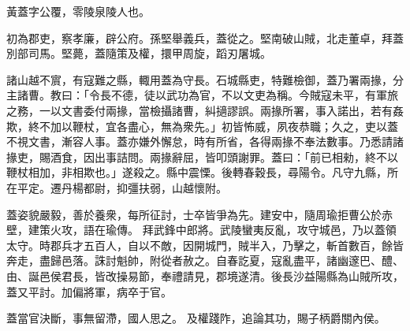 \begin{pinyinscope}
 
 
 黃蓋字公覆，零陵泉陵人也。
 
 
 初為郡吏，察孝廉，辟公府。孫堅舉義兵，蓋從之。堅南破山賊，北走董卓，拜蓋別部司馬。堅薨，蓋隨策及權，擐甲周旋，蹈刃屠城。
 
 
 
 
 諸山越不賔，有寇難之縣，輙用蓋為守長。石城縣吏，特難檢御，蓋乃署兩掾，分主諸曹。教曰：「令長不德，徒以武功為官，不以文吏為稱。今賊寇未平，有軍旅之務，一以文書委付兩掾，當檢攝諸曹，糾擿謬誤。兩掾所署，事入諾出，若有姦欺，終不加以鞭杖，宜各盡心，無為衆先。」初皆怖威，夙夜恭職；久之，吏以蓋不視文書，漸容人事。蓋亦嫌外懈怠，時有所省，各得兩掾不奉法數事。乃悉請諸掾吏，賜酒食，因出事詰問。兩掾辭屈，皆叩頭謝罪。蓋曰：「前已相勑，終不以鞭杖相加，非相欺也。」遂殺之。縣中震慄。後轉春穀長，尋陽令。凡守九縣，所在平定。遷丹楊都尉，抑彊扶弱，山越懷附。
 
 
蓋姿貌嚴毅，善於養衆，每所征討，士卒皆爭為先。建安中，隨周瑜拒曹公於赤壁，建策火攻，語在瑜傳。
 拜武鋒中郎將。武陵蠻夷反亂，攻守城邑，乃以蓋領太守。時郡兵才五百人，自以不敵，因開城門，賊半入，乃擊之，斬首數百，餘皆奔走，盡歸邑落。誅討魁帥，附從者赦之。自春訖夏，寇亂盡平，諸幽邃巴、醴、由、誕邑侯君長，皆改操易節，奉禮請見，郡境遂清。後長沙益陽縣為山賊所攻，蓋又平討。加偏將軍，病卒于官。
 
 
蓋當官決斷，事無留滯，國人思之。
 及權踐阼，追論其功，賜子柄爵關內侯。
 
 
\end{pinyinscope}